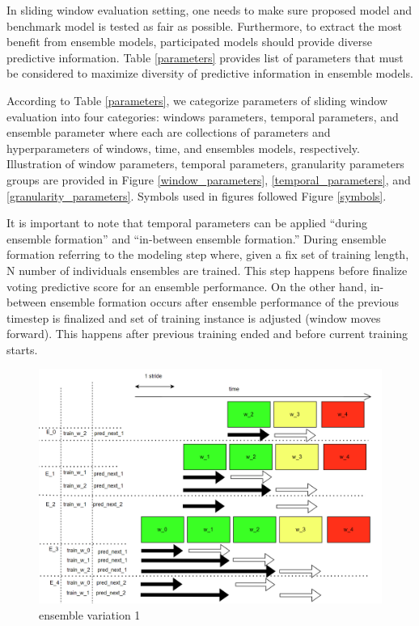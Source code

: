 \documentclass{IEEEtran}
\begin{document}
In sliding window evaluation setting, one needs to make sure proposed model and benchmark model is tested as fair as possible. Furthermore, to extract the most benefit from ensemble models, participated models should provide diverse predictive information. Table \ref{parameters} provides list of parameters that must be considered to maximize diversity of predictive information in ensemble models.

According to Table \ref{parameters}, we categorize parameters of sliding window evaluation into four categories: windows parameters, temporal parameters, and ensemble parameter where each are collections of parameters and hyperparameters of windows, time, and ensembles models, respectively. Illustration of window parameters, temporal parameters, granularity parameters groups are provided in Figure \ref{window_parameters}, \ref{temporal_parameters}, and \ref{granularity_parameters}. Symbols used in figures followed Figure \ref{symbols}.

It is important to note that temporal parameters can be applied ``during ensemble formation'' and ``in-between ensemble formation.'' During ensemble formation referring to the modeling step where, given a fix set of training length, N number of individuals ensembles are trained. This step happens before finalize voting predictive score for an ensemble performance. On the other hand, in-between ensemble formation occurs after ensemble performance of the previous timestep is finalized and set of training instance is adjusted (window moves forward). This happens after previous training ended and before current training starts.

\begin{figure}[htbp]
\centering
\includegraphics[width=.9\linewidth]{./images/screenshot_20220321_124235.png}
\caption{\label{ensemble_variation_1}ensemble variation 1}
\end{figure}
\end{document}
